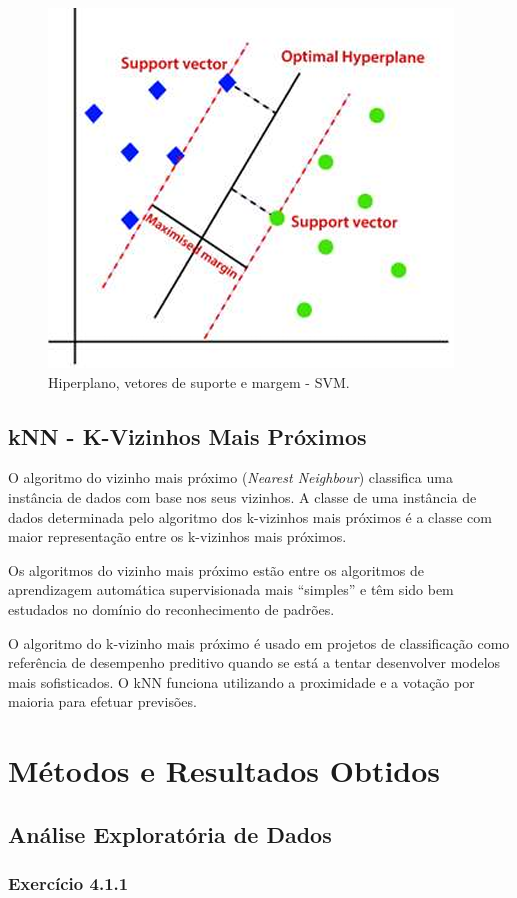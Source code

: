 \documentclass[conference]{IEEEtran}
\begin{document}
\begin{figure}
	\centering
	\includegraphics[width=0.5\linewidth]{svm}
	\caption{Hiperplano, vetores de suporte e margem - SVM.}
	\label{fig:svm}
\end{figure}


\subsection{kNN - K-Vizinhos Mais Próximos}


O algoritmo do vizinho mais próximo (\textit{Nearest Neighbour}) classifica uma instância de dados com base nos seus vizinhos. A classe de uma instância de dados determinada pelo algoritmo dos k-vizinhos mais próximos é a classe com maior representação entre os k-vizinhos mais próximos. 

Os algoritmos do vizinho mais próximo estão entre os algoritmos de aprendizagem automática supervisionada mais “simples” e têm sido bem estudados no domínio do reconhecimento de padrões. 

O algoritmo do k-vizinho mais próximo é usado em projetos de classificação como referência de desempenho preditivo quando se está a tentar desenvolver modelos mais sofisticados. O kNN funciona utilizando a proximidade e a votação por maioria para efetuar previsões. \cite{madureira2024knn}

\section{Métodos e Resultados Obtidos}

\subsection{Análise Exploratória de Dados}
\medskip
\subsubsection{\textbf{Exercício 4.1.1}}
\end{document}
